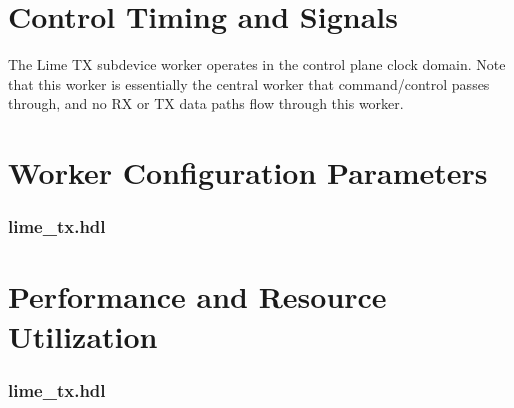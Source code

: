 \documentclass{article}
\def\comp{lime\_tx}
\edef\ecomp{lime_tx}
\def\Comp{Lime TX}
\begin{document}
\section*{Control Timing and Signals}
The \Comp{} subdevice worker operates in the control plane clock domain. Note that this worker is essentially the central worker that command/control passes through, and no RX or TX data paths flow through this worker.

\begin{landscape}
\section*{Worker Configuration Parameters}
\subsubsection*{\comp.hdl}

\section*{Performance and Resource Utilization}
\subsubsection*{\comp.hdl}

\end{landscape}
\end{document}
